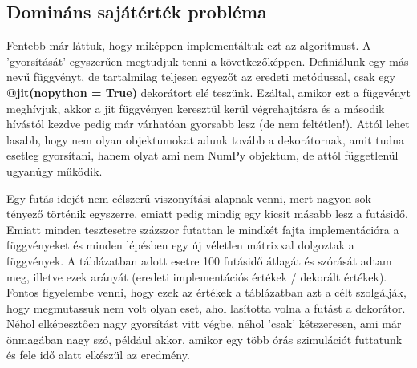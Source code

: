 \documentclass{article}
\theoremstyle{definition}
\theoremstyle{theorem}
\begin{document}
\subsection{Domináns sajátérték probléma}
Fentebb már láttuk, hogy miképpen implementáltuk ezt az algoritmust. A 'gyorsítását' egyszerűen megtudjuk tenni a következőképpen. Definiálunk egy más nevű függvényt, de tartalmilag teljesen egyezőt az eredeti metódussal, csak egy \textbf{@jit(nopython = True)} dekorátort elé teszünk. Ezáltal, amikor ezt a függvényt meghívjuk, akkor a jit függvényen keresztül kerül végrehajtásra és a második hívástól kezdve pedig már várhatóan gyorsabb lesz (de nem feltétlen!). Attól lehet lasabb, hogy nem olyan objektumokat adunk tovább a dekorátornak, amit tudna esetleg gyorsítani, hanem olyat ami nem NumPy objektum, de attól függetlenül ugyanúgy működik.
\pagebreak

Egy futás idejét nem célszerű viszonyítási alapnak venni, mert nagyon sok tényező történik egyszerre, emiatt pedig mindig egy kicsit másabb lesz a futásidő. Emiatt minden tesztesetre százszor futattan le mindkét fajta implementációra a függvényeket és minden lépésben egy új véletlen mátrixxal dolgoztak a függvények.\newline
A táblázatban adott esetre 100 futásidő átlagát és szórását adtam meg, illetve ezek arányát (eredeti implementációs értékek / dekorált értékek). Fontos figyelembe venni, hogy ezek az értékek a táblázatban azt a célt szolgálják, hogy megmutassuk nem volt olyan eset, ahol lasította volna a futást a dekorátor. Néhol elképesztően nagy gyorsítást vitt végbe, néhol 'csak' kétszeresen, ami már önmagában nagy szó, például akkor, amikor egy több órás szimulációt futtatunk és fele idő alatt elkészül az eredmény.
\end{document}
